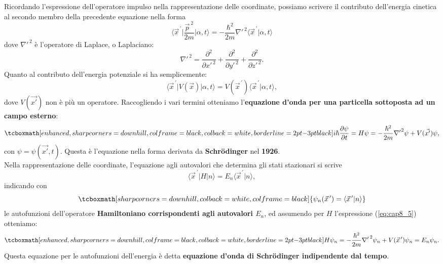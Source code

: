Ricordando l'espressione dell'operatore impulso nella rappresentazione delle coordinate, possiamo scrivere il contributo dell'energia cinetica al secondo membro della precedente equazione nella forma
	\begin{equation}
		\langle {\vec{x}}^{\, \prime}\vert \frac{\vec{p}^{\ 2}}{2m} \vert \alpha , t \rangle = -\frac{\hbar^2}{2m}{{\nabla}'}^{\, 2}\langle {\vec{x}}^{\, \prime}\vert \alpha , t \rangle
\end{equation}
dove ${{\nabla}'}^{\, 2}$ è l'operatore di Laplace, o Laplaciano:
\begin{equation}
{{\nabla}'}^{\, 2}= \frac{\partial ^2}{\partial {x'} ^{\, 2}}+\frac{\partial ^2}{\partial {y'} ^{\, 2}}+\frac{\partial ^2}{\partial {z'} ^{\, 2}}.
\end{equation}
Quanto al contributo dell'energia potenziale si ha semplicemente:
	\begin{equation}
		\langle {\vec{x}}^{\, \prime}\vert V(\vec{x}) \vert \alpha , t \rangle = V({\vec{x}}^{\, \prime})\langle {\vec{x}}^{\, \prime}  \vert \alpha , t \rangle ,
	\end{equation}
dove $V(\vec{x'})$ non è più un operatore. Raccogliendo i vari termini otteniamo l'\textbf{equazione d'onda per una particella sottoposta ad un campo esterno}:
	\begin{equation}
		\tcboxmath[enhanced, sharp corners=downhill, colframe=black, colback=white, borderline={2pt}{-3pt}{black}]{
			i\hbar \frac{\partial \psi}{\partial t} = H\psi = -\frac{\hbar ^2}{2m}{\nabla '} ^2 \psi + V(\vec{x'}) \psi,
			}
\end{equation}
con $\psi =\psi(\vec{x'}, t)$. Questa è l'equazione nella forma derivata da \textbf{Schr\"{o}dinger} nel \textbf{1926}.\\

Nella rappresentazione delle coordinate, l'equazione agli autovalori che determina gli stati stazionari si scrive
	\begin{equation}
		\langle {\vec{x}}^{\, \prime} \vert H \vert n \rangle = E_n\langle {\vec{x}}^{\, \prime} \vert n \rangle,
	\end{equation}
indicando con
	\begin{equation}
		\tcboxmath[sharp corners=downhill, colback=white, colframe=black]{
			\psi _n ({\vec{x}}^{\, \prime}) = \langle {\vec{x}}^{\, \prime} \vert n \rangle
			}
	\end{equation}
le autofunzioni dell'operatore \textbf{Hamiltoniano corrispondenti agli autovalori $E_n$}, ed assumendo per $H$ l'espressione (\ref{eq:cap8_5}) otteniamo:
	\begin{equation}
		\tcboxmath[enhanced, sharp corners=downhill, colframe=black, colback=white, borderline={2pt}{-3pt}{black}]{
			H\psi _n = -\frac{\hbar ^ 2}{2m}{{\nabla '}^{\, 2}} \psi _n + V({\vec{x}}^{\, \prime})\psi _n = E_n \psi _n.
			}
	\end{equation}
Questa equazione per le autofunzioni dell'energia è detta \textbf{equazione d'onda di Schr\"{o}dinger indipendente dal tempo}.\\

